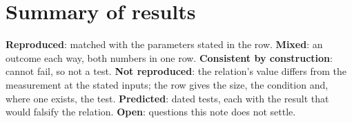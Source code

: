 \documentclass[
  10pt,
]{article}
\begin{document}
\begin{abstract}
ties the relation in evidence. The formation of structure before recombination is out of scope and acknowledged. A first pre-registered test on dwarf dispersions missed. The tests are pre-registered, except where marked post hoc, and the code is public; we set out those that can decide.
\end{abstract}

\clearpage
\section{Summary of results}\label{summary}

\textbf{Reproduced}: matched with the parameters stated in the row. \textbf{Mixed}: an outcome each way, both numbers in one row. \textbf{Consistent by construction}: cannot fail, so not a test. \textbf{Not reproduced}: the relation's value differs from the measurement at the stated inputs; the row gives the size, the condition and, where one exists, the test. \textbf{Predicted}: dated tests, each with the result that would falsify the relation. \textbf{Open}: questions this note does not settle.
\end{document}
